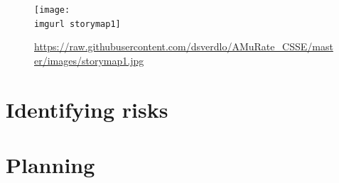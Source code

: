 \documentclass[12pt,portrait]{article}
\newcommand{\imgurl}{../images/} %
\newcommand{\weburl}[1]{\url{https://raw.githubusercontent.com/dsverdlo/AMuRate_CSSE/master/images/#1}}
\begin{document}
\begin{figure}[h]
\texttt{[image: \\imgurl storymap1]}
\caption{\weburl{storymap1.jpg} }
\end{figure}

 
 
\section{Identifying risks}


\section{Planning}











\end{document}
